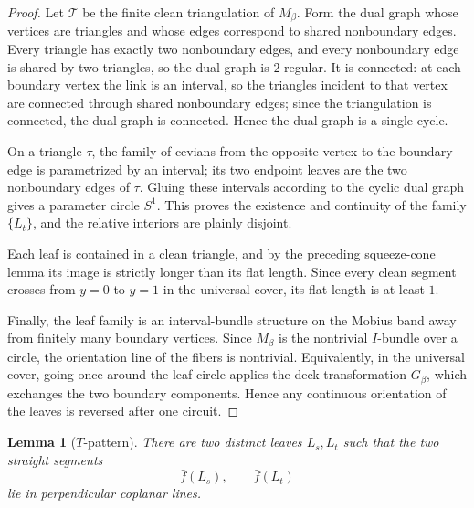 \documentclass[12pt]{article}
\newtheorem{lemma}[theorem]{Lemma}
\begin{document}
\begin{proof}
Let \(\mathcal T\) be the finite clean triangulation of \(M_\beta\).  Form the dual graph whose vertices are triangles and whose edges correspond to shared nonboundary edges.  Every triangle has exactly two nonboundary edges, and every nonboundary edge is shared by two triangles, so the dual graph is \(2\)-regular.  It is connected: at each boundary vertex the link is an interval, so the triangles incident to that vertex are connected through shared nonboundary edges; since the triangulation is connected, the dual graph is connected.  Hence the dual graph is a single cycle.

On a triangle \(\tau\), the family of cevians from the opposite vertex to the boundary edge is parametrized by an interval; its two endpoint leaves are the two nonboundary edges of \(\tau\).  Gluing these intervals according to the cyclic dual graph gives a parameter circle \(S^1\).  This proves the existence and continuity of the family \(\{L_t\}\), and the relative interiors are plainly disjoint.

Each leaf is contained in a clean triangle, and by the preceding squeeze-cone lemma its image is strictly longer than its flat length.  Since every clean segment crosses from \(y=0\) to \(y=1\) in the universal cover, its flat length is at least \(1\).

Finally, the leaf family is an interval-bundle structure on the Mobius band away from finitely many boundary vertices.  Since \(M_\beta\) is the nontrivial \(I\)-bundle over a circle, the orientation line of the fibers is nontrivial.  Equivalently, in the universal cover, going once around the leaf circle applies the deck transformation \(G_\beta\), which exchanges the two boundary components.  Hence any continuous orientation of the leaves is reversed after one circuit.
\end{proof}

\begin{lemma}[\(T\)-pattern]
There are two distinct leaves \(L_s,L_t\) such that the two straight segments
\[
\bar f(L_s),\qquad \bar f(L_t)
\]
lie in perpendicular coplanar lines.
\end{lemma}
\end{document}
